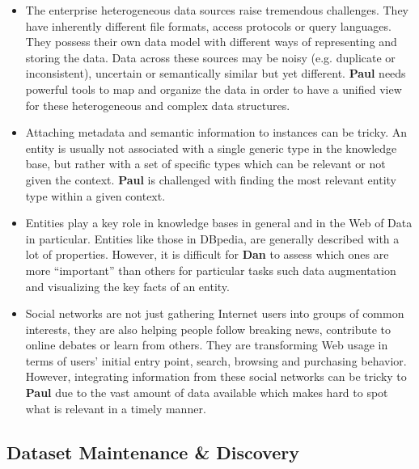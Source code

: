 \documentclass[a4paper,11pt,twoside]{ThesisStyle}
\begin{document}
\begin{itemize}
	\item The enterprise heterogeneous data sources raise tremendous challenges. They have inherently different file formats, access protocols or query languages. They possess their own data model with different ways of representing and storing the data. Data across these sources may be noisy (e.g. duplicate or inconsistent), uncertain or semantically similar but yet different. \textbf{Paul} needs powerful tools to map and organize the data in order to have a unified view for these heterogeneous and complex data structures.
	\item Attaching metadata and semantic information to instances can be tricky. An entity is usually not associated with a single generic type in the knowledge base, but rather with a set of specific types which can be relevant or not given the context. \textbf{Paul} is challenged with finding the most relevant entity type within a given context.
	\item Entities play a key role in knowledge bases in general and in the Web of Data in particular. Entities like those in DBpedia, are generally described with a lot of properties. However, it is difficult for \textbf{Dan} to assess which ones are more ``important'' than others for particular tasks such data augmentation and visualizing the key facts of an entity.
	\item Social networks are not just gathering Internet users into groups of common interests, they are also helping people follow breaking news, contribute to online debates or learn from others. They are transforming Web usage in terms of users' initial entry point, search, browsing and purchasing behavior. However, integrating information from these social networks can be tricky to \textbf{Paul} due to the vast amount of data available which makes hard to spot what is relevant in a timely manner.
\end{itemize}

\subsection{Dataset Maintenance \& Discovery}
\end{document}
